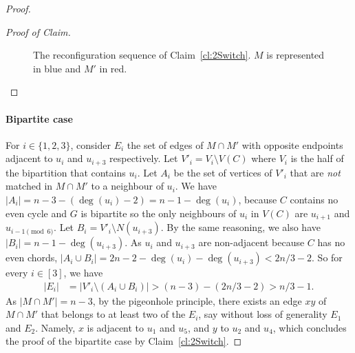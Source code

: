 \documentclass[11pt,a4paper]{article}
\theoremstyle{definition}
\newenvironment{poc}{\begin{proof}[Proof of
    Claim]\renewcommand*{\qedsymbol}{$\blacksquare$}}{\end{proof}}
\begin{document}
\begin{proof}
\begin{poc}
\begin{figure}[ht!]
    \caption{The reconfiguration sequence of Claim~\ref{cl:2Switch}. $M$ is
      represented in blue and $M'$ in red.}\label{fig:2Switch}
  \end{figure}
  \end{poc}

  \paragraph{Bipartite case}
  For $i \in \{1,2,3\}$, consider $E_i$ the set of edges of $M \cap M'$ with
  opposite endpoints adjacent to $u_i$ and $u_{i+3}$ respectively. Let
  $V'_i = V_i \setminus V(C)$ where $V_i$ is the half of the bipartition that
  contains $u_i$. Let $A_i$ be the set of vertices of $V'_i$ that are \emph{not}
  matched in $M \cap M'$ to a neighbour of $u_i$. We have
  $|A_i| = n-3 - (\deg(u_{i}) - 2) = n -1 - \deg(u_{i})$, because $C$ contains no even
  cycle and $G$ is bipartite so the only neighbours of $u_{i}$ in $V(C)$ are
  $u_{i+1}$ and $u_{i-1 \pmod 6}$. Let $B_i = V'_i \setminus N(u_{i+3})$. By the
  same reasoning, we also have $|B_i| = n - 1 - \deg(u_{i+3})$. As $u_i$ and $u_{i+3}$ are non-adjacent because $C$ has no even chords, $|A_i \cup B_i| = 2n - 2 - \deg(u_i) - \deg(u_{i+3}) < 2n/3-2$. So for every $i \in [3]$, we have
  \begin{align*}
      |E_i| &= |V'_i \setminus (A_i \cup B_i)|
       >  (n-3) - (2n/3 -2)
       > n/3 - 1.
  \end{align*}
  As $|M \cap M'| = n-3$, by the pigeonhole principle, there exists an edge
  $xy$ of $M \cap M'$ that belongs to at least two of the $E_i$, say without loss of generality
  $E_1$ and $E_2$. Namely, $x$ is adjacent to $u_1$ and $u_5$, and $y$ to $u_2$
  and $u_4$, which concludes the proof of the bipartite case by
  Claim~\ref{cl:2Switch}.


\end{proof}
\end{document}

